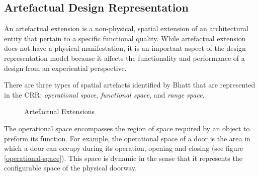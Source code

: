 \documentclass[12pt]{ucthesis}
\begin{document}
\subsection{Artefactual Design Representation}
An artefactual extension is a non-physical, spatial extension of an architectural entity that pertain to a specific functional quality. While artefactual extension does not have a physical manifestation, it is an important aspect of the design representation model because it affects the functionality and performance of a design from an experiential perspective. 

There are three types of spatial artefacts identified by Bhatt\cite{Bhatt} that are represented in the CRR: \emph{operational space}, \emph{functional space}, and \emph{range space}.

\begin{figure}[H]
 \centering
 \hspace{7 mm}
  \hspace{7 mm}
 \caption{Artefactual Extensions}
\label{artefactual-extensions}
\end{figure}

The operational space encompasses the region of space required by an object to preform its function. For example, the operational space of a door is the area in which a door can occupy during its operation, opening and closing (see figure \ref{operational-space}). This space is dynamic in the sense that it represents the configurable space of the physical doorway. 
\end{document}
